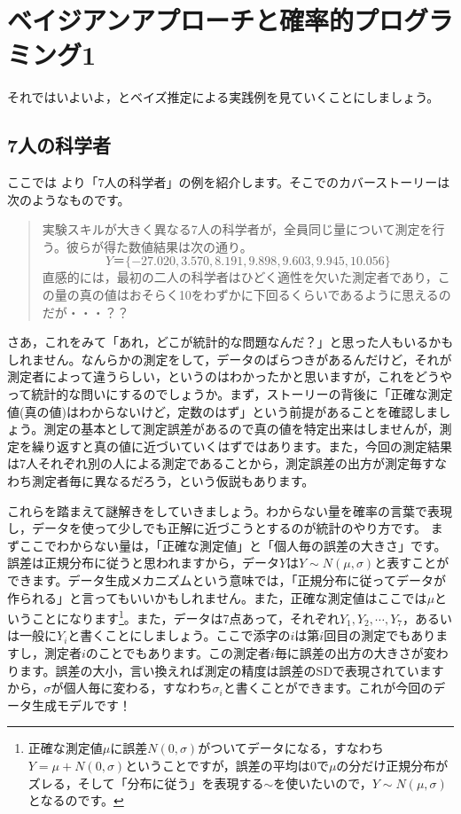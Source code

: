 \documentclass{ltjsbook}
\begin{document}
\chapter{ベイジアンアプローチと確率的プログラミング1}
それではいよいよ，とベイズ推定による実践例を見ていくことにしましょう。
\label{x18_MCMC}
\section{7人の科学者}
ここでは \textcite{Lee201709}より「7人の科学者」の例を紹介します。そこでのカバーストーリーは次のようなものです。

\begin{quote}
	実験スキルが大きく異なる7人の科学者が，全員同じ量について測定を行う。彼らが得た数値結果は次の通り。
	$$Y＝\lbrace -27.020,3.570,8.191,9.898,9.603,9.945,10.056 \rbrace$$
	直感的には，最初の二人の科学者はひどく適性を欠いた測定者であり，この量の真の値はおそらく10をわずかに下回るくらいであるように思えるのだが・・・？？
\end{quote}

さあ，これをみて「あれ，どこが統計的な問題なんだ？」と思った人もいるかもしれません。なんらかの測定をして，データのばらつきがあるんだけど，それが測定者によって違うらしい，というのはわかったかと思いますが，これをどうやって統計的な問いにするのでしょうか。まず，ストーリーの背後に「正確な測定値(真の値)はわからないけど，定数のはず」という前提があることを確認しましょう。測定の基本として測定誤差があるので真の値を特定出来はしませんが，測定を繰り返すと真の値に近づいていくはずではあります。また，今回の測定結果は7人それぞれ別の人による測定であることから，測定誤差の出方が測定毎すなわち測定者毎に異なるだろう，という仮説もあります。

これらを踏まえて謎解きをしていきましょう。わからない量を確率の言葉で表現し，データを使って少しでも正解に近づこうとするのが統計のやり方です。
まずここでわからない量は，「正確な測定値」と「個人毎の誤差の大きさ」です。誤差は正規分布に従うと思われますから，データ$Y$は$Y\sim N(\mu, \sigma)$と表すことができます。データ生成メカニズムという意味では，「正規分布に従ってデータが作られる」と言ってもいいかもしれません。また，正確な測定値はここでは$\mu$ということになります\footnote{正確な測定値$\mu$に誤差$N(0,\sigma)$がついてデータになる，すなわち$Y=\mu+N(0,\sigma)$ということですが，誤差の平均は$0$で$\mu$の分だけ正規分布がズレる，そして「分布に従う」を表現する$\sim$を使いたいので，$Y\sim N(\mu,\sigma)$となるのです。}。また，データは7点あって，それぞれ$Y_1,Y_2,\cdots,Y_7$，あるいは一般に$Y_i$と書くことにしましょう。ここで添字の$i$は第$i$回目の測定でもありますし，測定者$i$のことでもあります。この測定者$i$毎に誤差の出方の大きさが変わります。誤差の大小，言い換えれば測定の精度は誤差のSDで表現されていますから，$\sigma$が個人毎に変わる，すなわち$\sigma_i$と書くことができます。これが今回のデータ生成モデルです！
\end{document}
